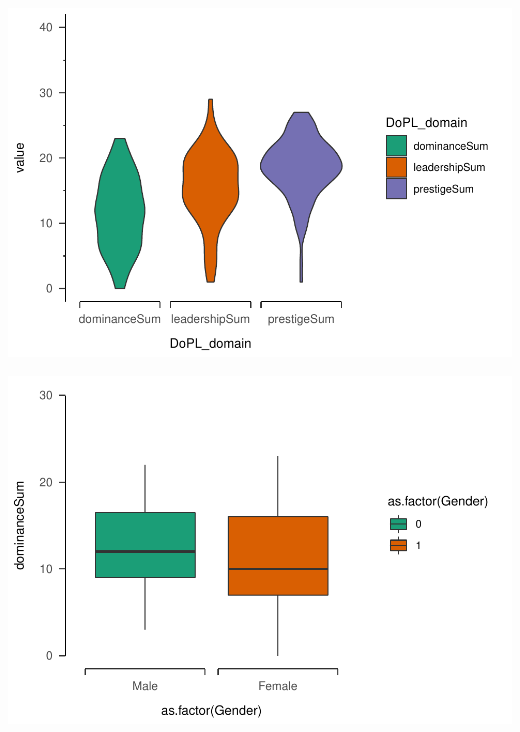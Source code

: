 \documentclass[
  english,
  man]{apa6}
\begin{document}
\includegraphics{DoPL-Experiment_files/figure-latex/unnamed-chunk-2-1.pdf}

\includegraphics{DoPL-Experiment_files/figure-latex/unnamed-chunk-3-1.pdf}
\end{document}
